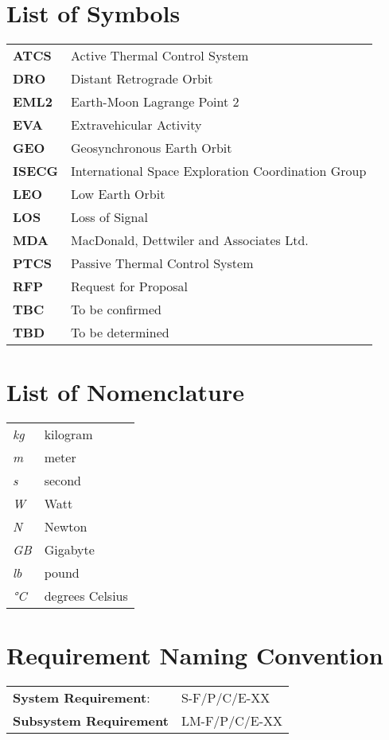 

\section*{List of Symbols}

\begin{tabular}{ll}
\textbf{ATCS}	&	Active Thermal Control System	\\
\textbf{DRO}	&	Distant Retrograde Orbit	\\
\textbf{EML2}	&	Earth-Moon Lagrange Point 2	\\
\textbf{EVA}	&	Extravehicular Activity	\\
\textbf{GEO}	&	Geosynchronous Earth Orbit	\\
\textbf{ISECG}	&	International Space Exploration Coordination Group	\\
\textbf{LEO}	&	Low Earth Orbit	\\
\textbf{LOS}	&	Loss of Signal	\\
\textbf{MDA}	&	MacDonald, Dettwiler and Associates Ltd.	\\
\textbf{PTCS}	&	Passive Thermal Control System	\\
\textbf{RFP}	&	Request for Proposal	\\
\textbf{TBC}	&	To be confirmed	\\
\textbf{TBD}	&	To be determined	\\

\end{tabular}

\section*{List of Nomenclature}

\begin{tabular}{ll}
\textit{kg}	&	kilogram\\
\textit{m}	&	meter	\\
\textit{s}	&	second	\\
\textit{W}	&	Watt	\\
\textit{N}	&	Newton	\\
\textit{GB}	&	Gigabyte\\
\textit{lb}	&	pound	\\
\textit{\si{\celsius}}	&	degrees Celsius

\end{tabular}
\vspace*{\fill}

\newpage

\section*{Requirement Naming Convention}
\begin{tabular}{ll}
\textbf{System Requirement}:	&	S-F/P/C/E-XX	\\
\textbf{Subsystem Requirement}	&	LM-F/P/C/E-XX	\\
\end{tabular}\\
\vspace{10pt}

